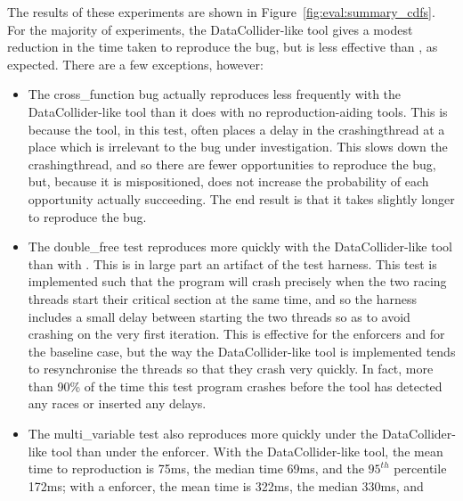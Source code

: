 
The results of these experiments are shown in
Figure~\ref{fig:eval:summary_cdfs}.  For the majority of experiments,
the DataCollider-like tool gives a modest reduction in the time taken
to reproduce the bug, but is less effective than {\technique}, as
expected.  There are a few exceptions, however:

\begin{itemize}
\item The cross\_function bug actually reproduces less frequently with
  the DataCollider-like tool than it does with no reproduction-aiding
  tools.  This is because the tool, in this test, often places a delay
  in the \gls{crashingthread} at a place which is irrelevant to the
  bug under investigation.  This slows down the \gls{crashingthread},
  and so there are fewer opportunities to reproduce the bug, but,
  because it is mispositioned, does not increase the probability of
  each opportunity actually succeeding.  The end result is that it
  takes slightly longer to reproduce the bug.
\item The double\_free test reproduces more quickly with the
  DataCollider-like tool than with {\technique}.  This is in large
  part an artifact of the test harness.  This test is implemented such
  that the program will crash precisely when the two racing threads
  start their critical section at the same time, and so the harness
  includes a small delay between starting the two threads so as to
  avoid crashing on the very first iteration.  This is effective for
  the {\technique} enforcers and for the baseline case, but the way
  the DataCollider-like tool is implemented tends to resynchronise the
  threads so that they crash very quickly.  In fact, more than 90\% of
  the time this test program crashes before the tool has detected any
  races or inserted any delays.
\item The multi\_variable test also reproduces more quickly under the
  DataCollider-like tool than under the {\technique} enforcer.  With
  the DataCollider-like tool, the mean time to reproduction is 75ms,
  the median time 69ms, and the $95^{th}$ percentile 172ms; with a
  {\technique} enforcer, the mean time is 322ms, the median 330ms, and

\end{itemize}
